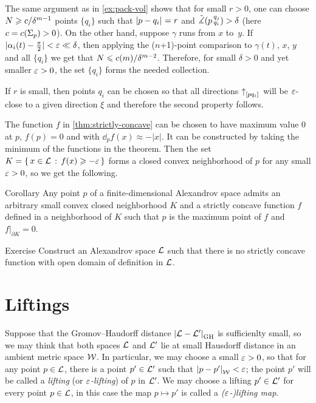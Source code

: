 The same argument as in \ref{ex:pack-vol} shows that for small $r>0$, one can
choose $N\geqslant c/\delta^{m-1}$ points $\{q_i\}$ such that $|{p}-{q_i}|_{}^{{}}=r$
and $\tilde\measuredangle(p\,{}^{q_j}_{q_i})>\delta$ (here $c=c(\Sigma_p)>0$).
On the other hand, suppose $\gamma$ runs from $x$ to~$y$.
If $|\alpha_i(t)- \tfrac\pi2|<\varepsilon\ll\delta$, then applying the ($n$+1)-point comparison to $\gamma(t)$, $x$, $y$ and all $\{q_i\}$ we get that
$N\leqslant c(m)/\delta^{m-2}$. 
Therefore, for small $\delta>0$ and yet smaller $\varepsilon>0$, the set $\{q_i\}$ forms the needed collection.

If $r$ is small, then points $q_i$ can be chosen so that all directions
${\uparrow}_{[{p}{q_i}]_{{}}}$ will be $\varepsilon$-close to a given direction $\xi$ and
therefore the second property follows.
\qeds

The function $f$ in \ref{thm:strictly-concave} can be chosen to have maximum value $0$ at $p$,
$f(p)=0$ and with $\dd_p f(x)\approx-|x|$.
It can be constructed by taking the minimum of the functions in the theorem.
Then the set $K=\left\{\,{x\in\mathcal{L}}\,:\,{f(x)\geqslant -\varepsilon}\,\right\}$ forms a closed convex neighborhood of $p$ for any small $\varepsilon>0$, so we get the following.


\begin{thm}{Corollary}\label{cor:convex-nbhd}
Any point $p$ of a finite-dimensional Alexandrov space admits an arbitrary small convex closed neighborhood $K$ and a strictly concave function $f$ defined in a neighborhood of $K$ such that $p$ is the maximum point of $f$
and $f|_{\partial K}=0$.
\end{thm}

\begin{thm}{Exercise}\label{ex:no-conc}
Construct an Alexandrov space $\mathcal{L}$ such that there is no strictly concave function with open domain of definition in $\mathcal{L}$.
\end{thm}


\section{Liftings}

Suppose that the Gromov--Haudorff distance $|{\mathcal{L}}-{\mathcal{L}'}|_{\operatorname{\rm GH}\nolimits}^{{}}$ is sufficienlty small, so we may think that both spaces $\mathcal{L}$ and $\mathcal{L}'$ lie at small Hausdorff distance in an ambient metric space $\mathcal{W}$.
In particular, we may choose a small $\varepsilon>0$, so that for any point $p\in \mathcal{L}$, there is a point $p'\in \mathcal{L}'$ such that $|{p}-{p'}|_{\mathcal{W}}^{{}}<\varepsilon$;
the point $p'$ will be called a \emph{lifting} (or \emph{$\varepsilon$-lifting}) of $p$ in $\mathcal{L}'$.
We may choose a lifting $p'\in\mathcal{L}'$ for every point $p\in\mathcal{L}$, 
in this case the map $p\mapsto p'$ is called a {}\emph{($\varepsilon$-)lifting map}.

